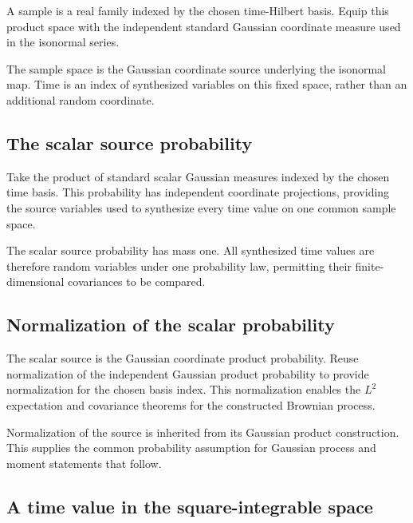 \documentclass[11pt,a4paper]{report}
\begin{document}
A sample is a real family indexed by the chosen time-Hilbert basis. Equip this product space with the independent standard Gaussian coordinate measure used in the isonormal series.



The sample space is the Gaussian coordinate source underlying the isonormal map. Time is an index of synthesized variables on this fixed space, rather than an additional random coordinate.

\subsection{\texorpdfstring{The scalar source probability}{The scalar source probability}}
\label{report-step-UnadjustedLangevin-CanonicalBrownian-lean-7}


Take the product of standard scalar Gaussian measures indexed by the chosen time basis. This probability has independent coordinate projections, providing the source variables used to synthesize every time value on one common sample space.



The scalar source probability has mass one. All synthesized time values are therefore random variables under one probability law, permitting their finite-dimensional covariances to be compared.

\subsection{\texorpdfstring{Normalization of the scalar probability}{Normalization of the scalar probability}}
\label{report-step-UnadjustedLangevin-CanonicalBrownian-lean-8}


The scalar source is the Gaussian coordinate product probability. Reuse normalization of the independent Gaussian product probability to provide normalization for the chosen basis index. This normalization enables the \(L^2\) expectation and covariance theorems for the constructed Brownian process.



Normalization of the source is inherited from its Gaussian product construction. This supplies the common probability assumption for Gaussian process and moment statements that follow.

\subsection{\texorpdfstring{A time value in the square-integrable space}{A time value in the square-integrable space}}
\label{report-step-UnadjustedLangevin-CanonicalBrownian-lean-9}
\end{document}
